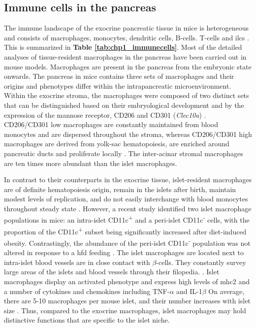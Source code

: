 \subsection{Immune cells in the pancreas}
The immune landscape of the exocrine pancreatic tissue in mice is heterogeneous and consists of macrophages, monocytes, dendritic cells, B-cells. T-cells and \glspl{ilc} \textbf{\cite{calderon_pancreas_2015}}. This is summarized in \textbf{Table \ref{tab:chp1_immunecells}}. Most of the detailed analyses of tissue-resident macrophages in the pancreas have been carried out in mouse models. Macrophages are present in the pancreas from the embryonic state onwards. The pancreas in mice contains three sets of macrophages and their origins and phenotypes differ within the intrapancreatic microenvironment. Within the exocrine stroma, the macrophages were composed of two distinct sets that can be distinguished based on their embryological development and by the expression of the mannose receptor, CD206 and CD301 (\textit{Clec10a}) \textbf{\cite{calderon_pancreas_2015,cruz_macrophages_2020}}. CD206/CD301 low macrophages are constantly maintained from blood monocytes and are dispersed throughout the stroma, whereas CD206/CD301 high macrophages are derived from yolk-sac hematopoiesis, are enriched around pancreatic ducts and proliferate locally \textbf{\cite{calderon_pancreas_2015,cruz_macrophages_2020}}. The inter-acinar stromal macrophages are ten times more abundant than the islet macrophages.\\
\par In contrast to their counterparts in the exocrine tissue, islet-resident macrophages are of definite hematopoiesis origin, remain in the islets after birth, maintain modest levels of replication, and do not easily interchange with blood monocytes throughout steady state \textbf{\cite{calderon_pancreas_2015,cruz_macrophages_2020,carrero_resident_2017}}. However, a recent study identified two islet macrophage populations in mice: an intra-islet CD11c\textsuperscript{+} and a peri-islet CD11c\textsuperscript{-} cells, with the proportion of the CD11c\textsuperscript{+} subset being significantly increased after diet-induced obesity. Contrastingly, the abundance of the peri-islet CD11c\textsuperscript{-} population was not altered in response to a \gls{hfd} feeding \textbf{\cite{ying_expansion_2019}}. The islet macrophages are located next to intra-islet blood vessels are in close contact with $\beta$-cells. They constantly survey large areas of the islets and blood vessels through their filopedia. \textbf{\cite{carrero_resident_2017,calderon_dendritic_2008,zinselmeyer_resident_2018}}. Islet macrophages display an activated phenotype and express high levels of \gls{mhc2} and a number of cytokines and chemokines including TNF-$\alpha$ and IL-1$\beta$ \textbf{\cite{calderon_pancreas_2015,carrero_resident_2017,ferris_islet-resident_2017}} On average, there are 5-10 macrophages per mouse islet, and their number increases with islet size \textbf{\cite{unanue_macrophages_2016}}. Thus, compared to the exocrine macrophages, islet macrophages may hold distinctive functions that are specific to the islet niche.\\
